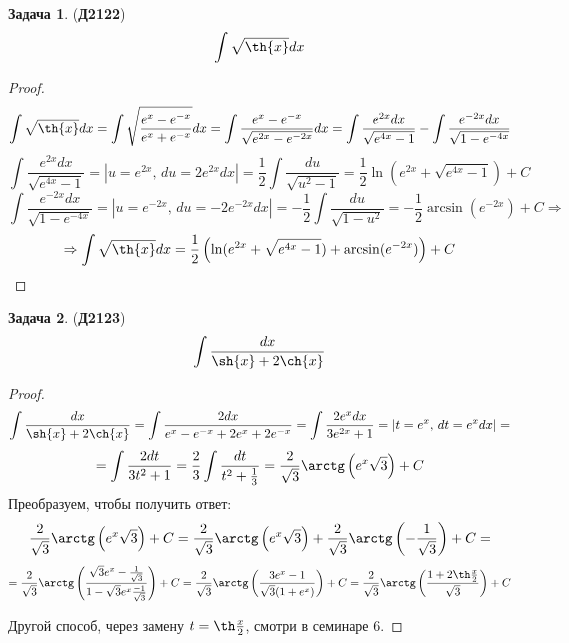 \documentclass[12pt]{article}
\theoremstyle{definition}
\newtheorem{problem}{Задача}
\DeclareMathOperator{\dint}{\displaystyle\int}
\begin{document}
\begin{problem}(\textbf{Д2122})
	$$
		\dint \sqrt{\th{x}}dx
	$$
\end{problem}
\begin{proof}
	$$
		\dint \sqrt{\th{x}}dx = \dint \sqrt{\dfrac{e^{x} - e^{-x}}{e^{x} + e^{-x}}}dx = \dint \dfrac{e^{x} - e^{-x}}{\sqrt{e^{2x} - e^{-2x}}}dx = \dint \dfrac{e^{2x}dx}{\sqrt{e^{4x} - 1}} - \dint \dfrac{e^{-2x}dx}{\sqrt{1 - e^{-4x}}}
	$$
	$$
		\dint \dfrac{e^{2x}dx}{\sqrt{e^{4x} - 1}} = |u = e^{2x}, \, du = 2e^{2x}dx| = \dfrac{1}{2}\dint \dfrac{du}{\sqrt{u^2 - 1}} = \dfrac{1}{2}\ln(e^{2x} + \sqrt{e^{4x} - 1}) + C
	$$
	$$
		\dint \dfrac{e^{-2x}dx}{\sqrt{1 - e^{-4x}}} = |u = e^{-2x}, \, du = -2e^{-2x}dx| = -\dfrac{1}{2}\dint\dfrac{du}{\sqrt{1 - u^2}} = -\dfrac{1}{2}\arcsin(e^{-2x}) + C \Rightarrow
	$$
	$$
		\Rightarrow \dint \sqrt{\th{x}}dx = \dfrac{1}{2}\left(\ln(e^{2x} + \sqrt{e^{4x} - 1}) + \arcsin(e^{-2x}) \right) + C
	$$
\end{proof}
\begin{problem}(\textbf{Д2123})
	$$
		\dint \dfrac{dx}{\sh{x} + 2\ch{x}}
	$$
\end{problem}
\begin{proof}
	$$
		\dint \dfrac{dx}{\sh{x} + 2\ch{x}} = \dint \dfrac{2dx}{e^x - e^{-x} + 2e^{x} + 2e^{-x}} = \dint \dfrac{2e^xdx}{3e^{2x} + 1} =|t = e^{x}, \, dt = e^x dx|= 
	$$
	$$
		= \dint\dfrac{2dt}{3t^2 + 1} = \dfrac{2}{3} \dint \dfrac{dt}{t^2 + \tfrac{1}{3}} = \dfrac{2}{\sqrt{3}}\arctg\left(e^x\sqrt{3}\right) + C
	$$
	Преобразуем, чтобы получить ответ:
	$$
		\dfrac{2}{\sqrt{3}}\arctg\left(e^x\sqrt{3}\right) + C = \dfrac{2}{\sqrt{3}}\arctg\left(e^x\sqrt{3}\right) +  \dfrac{2}{\sqrt{3}}\arctg\left(-\dfrac{1}{\sqrt{3}}\right) + C  =
	$$
	$$	
		= \dfrac{2}{\sqrt{3}}\arctg\left(\dfrac{\sqrt{3}e^x - \tfrac{1}{\sqrt{3}}}{1 - \sqrt{3}e^x\tfrac{-1}{\sqrt{3}}}\right) + C = \dfrac{2}{\sqrt{3}}\arctg\left(\dfrac{3e^x - 1}{\sqrt{3}(1 + e^x)}\right) + C = \dfrac{2}{\sqrt{3}}\arctg\left(\dfrac{1 + 2\th\tfrac{x}{2}}{\sqrt{3}}\right) + C
	$$
	
	Другой способ, через замену $t = \th\tfrac{x}{2}$, смотри в семинаре $6$.
\end{proof}
\end{document}
